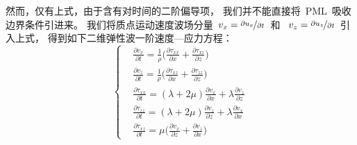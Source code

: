 \documentclass[UTF8]{ctexart}
\begin{document}
然而，仅有上式，由于含有对时间的二阶偏导项，
我们并不能直接将~PML~吸收边界条件引进来。
我们将质点运动速度波场分量~$v_x=\nicefrac{\partial u_x}{\partial t}$~和
~$v_z=\nicefrac{\partial u_z}{\partial t}$~引入上式，
得到如下二维弹性波一阶速度—应力方程：
\begin{equation}
\left\{ \begin{aligned}
& \frac{\partial v_x}{\partial t}=\frac{1}{\rho}\big(\frac{\partial \tau_{xx}}{\partial x}+\frac{\partial \tau_{xz}}{\partial z}\big) \\
& \frac{\partial v_z}{\partial t}=\frac{1}{\rho}\big(\frac{\partial \tau_{xz}}{\partial x}+\frac{\partial \tau_{zz}}{\partial z}\big) \\
& \frac{\partial \tau_{xx}}{\partial t}=(\lambda+2\mu)\frac{\partial v_x}{\partial x}+\lambda\frac{\partial v_z}{\partial z} \\
& \frac{\partial \tau_{zz}}{\partial t}=(\lambda+2\mu)\frac{\partial v_z}{\partial z}+\lambda\frac{\partial v_x}{\partial x} \\
& \frac{\partial \tau_{xz}}{\partial t}=\mu\big(\frac{\partial v_x}{\partial z}+\frac{\partial v_z}{\partial x} \big)
\end{aligned} \right.
\end{equation}
\end{document}
